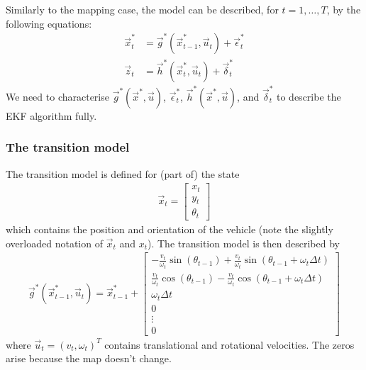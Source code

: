 Similarly to the mapping case, the model can be described, for $t = 1, \dotsc, T$, by the following equations:
\begin{align}
	\vec x_t^\ast 	&= \vec g^\ast(\vec x_{t - 1}^\ast, \vec u_t) + \vec \epsilon_t^\ast \\
	\vec z_t 		&= \vec h^\ast(\vec x_t^\ast, \vec u_t) + \vec \delta_t^\ast
\end{align}
We need to characterise $\vec g^\ast(\vec x^\ast, \vec u)$, $\vec \epsilon_t^\ast$, $\vec h^\ast(\vec x^\ast, \vec u)$, and $\vec \delta_t^\ast$ to describe the EKF algorithm fully.

\subsubsection{The transition model}
The transition model is defined for (part of) the state
\begin{align}
	\vec x_t = 
		\begin{bmatrix}
			x_t \\
			y_t \\
			\theta_t
		\end{bmatrix}
\end{align}
which contains the position and orientation of the vehicle (note the slightly overloaded notation of $\vec x_t$ and $x_t$). The transition model is then described by
\begin{align}
	\vec g^\ast(\vec x^\ast_{t - 1}, \vec u_t) = \vec x^\ast_{t - 1} + 
		\begin{bmatrix}
			-\frac{v_t}{\omega_t} \sin(\theta_{t - 1}) + \frac{v_t}{\omega_t} \sin(\theta_{t - 1} + \omega_t \Delta t) \\
			\frac{v_t}{\omega_t} \cos(\theta_{t - 1}) - \frac{v_t}{\omega_t} \cos(\theta_{t - 1} + \omega_t \Delta t) \\
			\omega_t \Delta t \\
			0 \\
			\vdots \\
			0
		\end{bmatrix}
\end{align}
where $\vec u_t = (v_t, \omega_t)^T$ contains translational and rotational velocities. The zeros arise because the map doesn't change.


